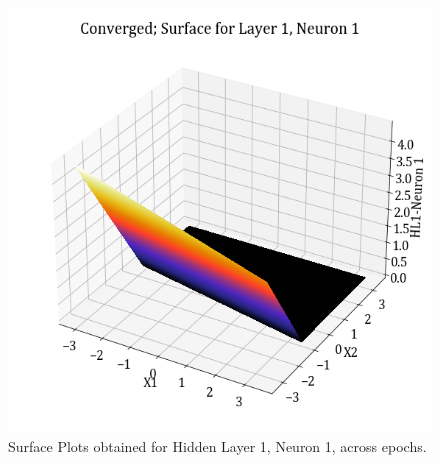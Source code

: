 \documentclass[11pt,a4paper]{article}
\begin{document}
\begin{figure}[H]
    \includegraphics[scale=0.4]{images/1B_MLFFNN_conv_HL1_N1.png}
    \caption{Surface Plots obtained for Hidden Layer 1, Neuron 1, across epochs.}
    \label{HL1N1}
\end{figure}
\end{document}
